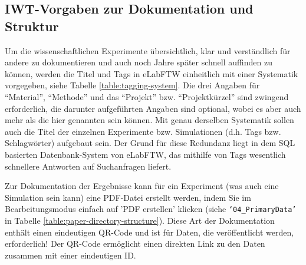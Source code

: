\subsection{IWT-Vorgaben zur Dokumentation und Struktur}

Um die wissenschaftlichen Experimente übersichtlich, klar und verständlich für andere zu dokumentieren und auch noch Jahre später schnell auffinden zu können, werden die Titel und Tags in eLabFTW einheitlich mit einer Systematik vorgegeben, siehe Tabelle \ref{table:tagging-system}. Die drei Angaben für ``Material'', ``Methode'' und das ``Projekt'' bzw. ``Projektkürzel'' sind zwingend erforderlich, die darunter aufgeführten Angaben sind optional, wobei es aber auch mehr als die hier genannten sein können. Mit genau derselben Systematik sollen auch die Titel der einzelnen Experimente bzw. Simulationen (d.h. Tags bzw. Schlagwörter) aufgebaut sein. Der Grund für diese Redundanz liegt in dem SQL basierten Datenbank-System von eLabFTW, das mithilfe von Tags wesentlich schnellere Antworten auf Suchanfragen liefert.

Zur Dokumentation der Ergebnisse kann für ein Experiment (was auch eine Simulation sein kann) eine PDF-Datei erstellt werden, indem Sie im Bearbeitungsmodus einfach auf 'PDF erstellen' klicken (siehe
\texttt{‘04\_PrimaryData’} in Tabelle \ref{table:paper-directory-structure}).
Diese Art der Dokumentation enthält einen eindeutigen QR-Code und ist für Daten, die veröffentlicht werden, erforderlich! Der QR-Code ermöglicht einen direkten Link zu den Daten zusammen mit einer eindeutigen ID.


